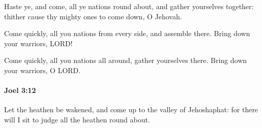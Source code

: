 			\begin{versebox}
					\item[BHS] 
					\item[LXX] 
					\item[ASV] Haste ye, and come, all ye nations round about, and gather yourselves together: thither cause thy mighty ones to come down, O Jehovah.
					\item[NIV] Come quickly, all you nations from every side, and assemble there. Bring down your warriors, LORD!
					\item[NRSV] Come quickly, all you nations all around, gather yourselves there. Bring down your warriors, O LORD.
			\end{versebox}

		\paragraph{Joel 3:12} %
			\label{JOEL-3-12}

			Let the heathen be wakened, and come up to the valley of Jehoshaphat: for there will I sit to judge all the heathen round about.

